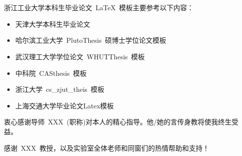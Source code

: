 
\chapter*{\heiti\bfseries{\acknowledgementtitle}}
\chaptermark{\acknowledgementname}

浙江工业大学本科生毕业论文~\LaTeX~模板主要参考以下内容：
\begin{itemize}
  \item 天津大学本科生毕业论文
  \item 哈尔滨工业大学~PlutoThesis~硕博士学位论文模板
  \item 武汉理工大学学位论文~WHUTThesis~模板
  \item 中科院~CASthesis~模板
  \item 浙江大学~cs\_zjut\_theis~模板
  \item 上海交通大学毕业论文Latex模板
\end{itemize}

\vspace*{1em}

衷心感谢导师~XXX~(职称)对本人的精心指导。他/她的言传身教将使我终生受益。

感谢~XXX~教授，以及实验室全体老师和同窗们的热情帮助和支持！




